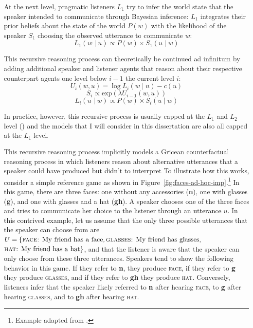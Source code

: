 At the next level, pragmatic listeners $L_1$ try to infer the world state that the speaker intended to communicate
through Bayesian inference: $L_1$ integrates their prior beliefs about the state of the world $P(w)$ with the likelihood
of the speaker $S_1$ choosing the observed utterance to communicate $w$:
$$L_1(w \mid u) \propto P(w) \times S_1(u \mid w)$$

This recursive reasoning process can theoretically be continued ad infinitum by adding additional speaker and listener agents that 
reason about their respective counterpart agents one level below $i-1$ the current level $i$:
$$U_i(w,u) = \log L_{i}(w \mid u) - c(u)$$
$$S_i \propto \mbox{exp} \left( \lambda U_{i-1}(w,u) \right)$$
$$ L_i(u \mid w) \propto P(w) \times S_i(u \mid w)$$


In practice, however, this recursive process is usually capped at the $L_1$ and $L_2$ level () and the models
that I will consider in this dissertation are also all capped at the $L_1$ level.



This recursive reasoning process implicitly models a Gricean counterfactual reasoning process in which listeners reason about alternative utterances
that a speaker could have produced but didn't to interrpret To illustrate how this works, consider a simple reference game as shown in Figure~\ref{fig:faces-ad-hoc-imp}.\footnote{Example adapted from \cite{GoodmanFrank2016}.} In this game,
there are three faces: one without any accessories (\textbf{n}), one with glasses (\textbf{g}), and one with glasses and a hat (\textbf{gh}). A speaker chooses one of the three faces
and tries to communicate her choice to the listener through an utterance $u$. In this contrived example, let us assume that the only three possible utterances that the
speaker can choose from are $U=\{\mbox{\textsc{face}: My friend has a face},\mbox{\textsc{glasses}: My friend has glasses},$ $\mbox{\textsc{hat}: My friend has a hat}\}$, 
and that the listener is aware that the speaker can only choose from these three utterances. Speakers tend to show the following behavior in this game. If they refer
to \textbf{n}, they produce \textsc{face}, if they refer to \textbf{g}  they produce \textsc{glasses}, and if they refer to \textbf{gh} they produce \textsc{hat}. Conversely, listeners infer that 
the speaker likely referred to \textbf{n} after hearing \textsc{face}, to \textbf{g}  after hearing \textsc{glasses}, and to \textbf{gh} after hearing \textsc{hat}.

